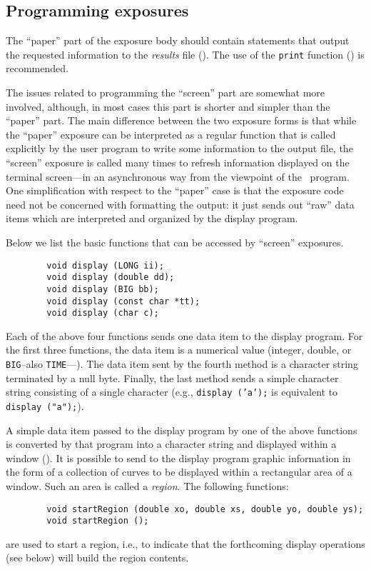 \subsection{Programming exposures}
\label{rm_ex_pr}

The ``paper'' part of the exposure body should contain statements that output
the requested information to the {\em results\/} file ().
The use of the {\tt print} function () is recommended.

The issues related to programming the ``screen'' part are somewhat more
involved, although, in most cases this part is shorter and simpler than the
``paper'' part.
The main difference between the two exposure forms is that while the
``paper'' exposure can be interpreted as a regular function that is called
explicitly by the user program to write some information to the
output file, the ``screen'' exposure is called many times to refresh
information displayed on the terminal screen---in an asynchronous way from the
viewpoint of the \smurph\ program.
One simplification with respect to the ``paper'' case is that the exposure
code need not be concerned with formatting the output: it just sends out
``raw'' data items which are interpreted and organized by the display
program.

Below we list the basic functions that can be accessed
by ``screen'' exposures.

\begin{verbatim}
        void display (LONG ii);
        void display (double dd);
        void display (BIG bb);
        void display (const char *tt);
        void display (char c);
\end{verbatim}

Each of the above four functions sends one data item to the display program.
For the first three functions, the data item is a numerical value (integer,
double, or {\tt BIG}--also {\tt TIME}---).
The data item sent by the fourth method is a character string terminated by a
null byte.
Finally, the last method sends a simple character string consisting of a
single character (e.g., {\tt display~('a');} is equivalent to
{\tt display~("a");}).

A simple data item passed to the display program by one of the above
functions is converted by that program into a character string and displayed
within a window ().
It is possible to send to the display program graphic information in the
form of a collection of curves to be displayed within a rectangular area
of a window.
Such an area is called a {\em region}.
The following functions:
\begin{verbatim}
        void startRegion (double xo, double xs, double yo, double ys);
        void startRegion ();
\end{verbatim}
are used to start a region,
i.e., to indicate that the forthcoming display operations (see below)
will build the region contents.

